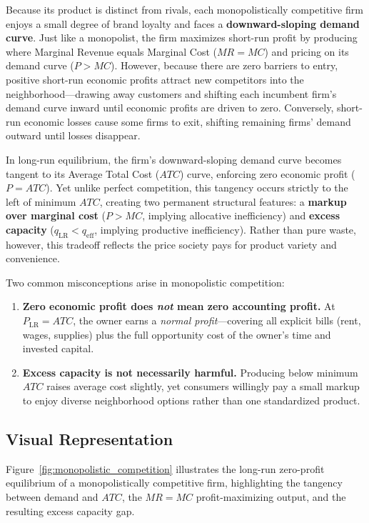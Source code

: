 \documentclass[11pt,letterpaper]{article}
\begin{document}
Because its product is distinct from rivals, each monopolistically competitive firm enjoys a small degree of brand loyalty and faces a \textbf{downward-sloping demand curve}. Just like a monopolist, the firm maximizes short-run profit by producing where Marginal Revenue equals Marginal Cost ($MR = MC$) and pricing on its demand curve ($P > MC$). However, because there are zero barriers to entry, positive short-run economic profits attract new competitors into the neighborhood—drawing away customers and shifting each incumbent firm's demand curve inward until economic profits are driven to zero. Conversely, short-run economic losses cause some firms to exit, shifting remaining firms' demand outward until losses disappear.

In long-run equilibrium, the firm's downward-sloping demand curve becomes tangent to its Average Total Cost ($ATC$) curve, enforcing zero economic profit ($P = ATC$). Yet unlike perfect competition, this tangency occurs strictly to the left of minimum $ATC$, creating two permanent structural features: a \textbf{markup over marginal cost} ($P > MC$, implying allocative inefficiency) and \textbf{excess capacity} ($q_{\text{LR}} < q_{\text{eff}}$, implying productive inefficiency). Rather than pure waste, however, this tradeoff reflects the price society pays for product variety and convenience.

\begin{tcolorbox}[colback=LightTerracotta,colframe=CourseOrange,title=\textbf{Clear It Up: Zero Economic Profit and Excess Capacity}]
Two common misconceptions arise in monopolistic competition:
\begin{enumerate}
    \item \textbf{Zero economic profit does \emph{not} mean zero accounting profit.} At $P_{\text{LR}} = ATC$, the owner earns a \emph{normal profit}—covering all explicit bills (rent, wages, supplies) plus the full opportunity cost of the owner's time and invested capital.
    \item \textbf{Excess capacity is not necessarily harmful.} Producing below minimum $ATC$ raises average cost slightly, yet consumers willingly pay a small markup to enjoy diverse neighborhood options rather than one standardized product.
\end{enumerate}
\end{tcolorbox}

\subsection*{Visual Representation}
Figure~\ref{fig:monopolistic_competition} illustrates the long-run zero-profit equilibrium of a monopolistically competitive firm, highlighting the tangency between demand and $ATC$, the $MR = MC$ profit-maximizing output, and the resulting excess capacity gap.
\end{document}
